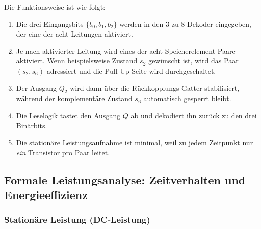 \documentclass[12pt, a4paper]{article}
\theoremstyle{definition}
\theoremstyle{remark}
\begin{document}
  
  

Die Funktionsweise ist wie folgt:

\begin{enumerate}[label=(\roman*)]
  \item Die drei Eingangsbits $\{b_0, b_1, b_2\}$ werden in den 3-zu-8-Dekoder eingegeben, der eine der acht Leitungen aktiviert.
  
  \item Je nach aktivierter Leitung wird eines der acht Speicherelement-Paare aktiviert. Wenn beispielsweise Zustand $s_2$ gewünscht ist, wird das Paar $(s_2, s_6)$ adressiert und die Pull-Up-Seite wird durchgeschaltet.
  
  \item Der Ausgang $Q_2$ wird dann über die Rückkopplungs-Gatter stabilisiert, während der komplementäre Zustand $s_6$ automatisch gesperrt bleibt.
  
  \item Die Leselogik tastet den Ausgang $Q$ ab und dekodiert ihn zurück zu den drei Binärbits.
  
  \item Die stationäre Leistungsaufnahme ist minimal, weil zu jedem Zeitpunkt nur \textit{ein} Transistor pro Paar leitet.
\end{enumerate}

\subsection{Formale Leistungsanalyse: Zeitverhalten und Energieeffizienz}
\label{subsec:leistungsanalyse_formal}

\subsubsection{Stationäre Leistung (DC-Leistung)}
\end{document}
